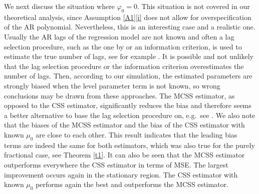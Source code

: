 {{We next discuss the situation where $\varphi_0 = 0$. This situation is not covered in our theoretical analysis, since Assumption \ref{A1}\ref{i} does not allow for overspecification of the AR polynomial. Nevertheless, this is an
interesting case and a realistic one. Usually the AR lags of the regression model are not known and often a lag selection procedure, such as the one by \textcite{box1990time} or an information criterion, is used to estimate the
true number of lags, see for example \textcite{huang2022consistent}. It is possible and not unlikely that the lag selection procedure or the information criterion overestimates the number of lags. Then, according to our
simulation, the estimated parameters are strongly biased when the level parameter term is not known, so wrong conclusions may be drawn from these approaches. The MCSS estimator, as opposed to the CSS estimator, significantly
reduces the bias and therefore seems a better alternative to base the lag selection procedure on, e.g.\ see \textcite{lee2015model}.  We also note that the biases of the MCSS estimator and the bias of the CSS estimator with known
$\mu_0$ are close to each other. This result indicates that the leading bias terms are indeed the same for both estimators, which was also true for the purely fractional case, see Theorem \ref{t1}. It can also be seen that the
MCSS estimator outperforms everywhere the CSS estimator in terms of MSE. The largest improvement occurs again in the stationary region. The CSS estimator with known $\mu_0$ performs again the best and outperforms the MCSS
estimator.

}}

